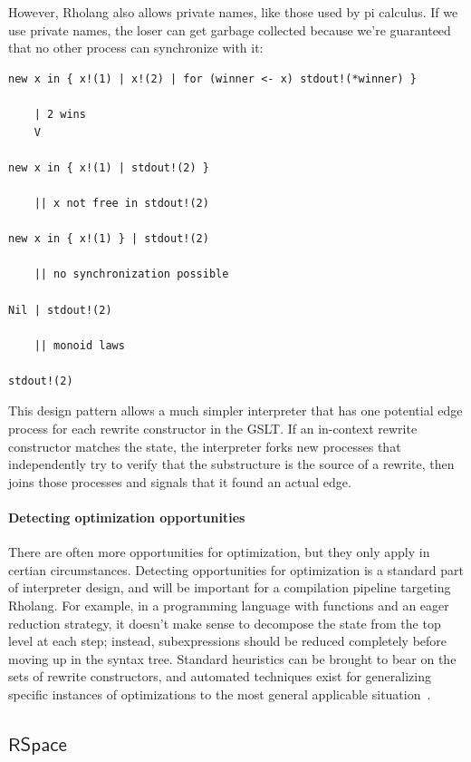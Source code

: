 \documentclass{article}
\newcommand{\RS}{\mathsf{RSpace}}
\begin{document}
\noindent However, Rholang also allows private names, like those used by pi calculus.  If we use private names, the loser can get garbage collected because we're guaranteed that no other process can synchronize with it:

\begin{verbatim}
new x in { x!(1) | x!(2) | for (winner <- x) stdout!(*winner) }

    | 2 wins
    V

new x in { x!(1) | stdout!(2) }

    || x not free in stdout!(2)

new x in { x!(1) } | stdout!(2)

    || no synchronization possible

Nil | stdout!(2)

    || monoid laws

stdout!(2)
\end{verbatim}

This design pattern allows a much simpler interpreter that has one potential edge process for each rewrite constructor in the GSLT.  If an in-context rewrite constructor matches the state, the interpreter forks new processes that independently try to verify that the substructure is the source of a rewrite, then joins those processes and signals that it found an actual edge.

\paragraph{Detecting optimization opportunities}

There are often more opportunities for optimization, but they only apply in certian circumstances.  Detecting opportunities for optimization is a standard part of interpreter design, and will be important for a compilation pipeline targeting Rholang.  For example, in a programming language with functions and an eager reduction strategy, it doesn't make sense to decompose the state from the top level at each step; instead, subexpressions should be reduced completely before moving up in the syntax tree.  Standard heuristics can be brought to bear on the sets of rewrite constructors, and automated techniques exist for generalizing specific instances of optimizations to the most general applicable situation~\cite{Tate2010}.

\subsection{$\RS$}
\end{document}
